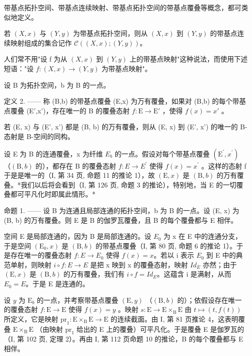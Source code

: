 带基点拓扑空间、带基点连续映射、带基点拓扑空间的带基点覆叠等概念，都可类似地定义。

若 \((X,x)\) 与 \((Y,y)\) 为带基点拓扑空间，则从 \((X,x)\) 到 \((Y,y)\) 的带基点连续映射组成的集合记作 \(\mathcal{C}((X,x);(Y,y))\)。

人们常不用"设 f 为从 \((X, x)\) 到 \((Y, y)\) 上的带基点映射"这种说法，而使用下述短语："设 \(f: (X, x) \to (Y, y)\) 为带基点映射"。

设 B 为拓扑空间，b 为 B 的一点。

定义 2. —— 称 (B,b) 的带基点覆叠 (E,x) 为万有覆叠，如果对 (B,b) 的每个带基点覆叠 (E',x')，存在唯一的 B 的覆叠态射 \(f: \mathrm{E} \to \mathrm{E}'\) ，使得 \(f(x) = x'\) 。

若 (E, x) 与 (E', x') 都是 (B, b) 的万有覆叠，则从 (E, x) 到 (E', x') 的唯一的 B-态射是 B-空间的同构。

设 E 为 B 的连通覆叠，x 为纤维 \(E_{b}\) 的一点。假设对每个带基点覆叠 \((\mathrm{E}^{\prime}, x^{\prime})\) （\((\mathrm{B}, b)\) 的），都存在 B 的覆叠态射 \(f: E \to E^{\prime}\) 使得 \(f(x) = x^{\prime}\) 。这样的态射 f 于是是唯一的（I, 第 34 页, 命题 11 的推论 1），故 \((\mathrm{E}, x)\) 是 \((\mathrm{B}, b)\) 的万有覆叠。*我们以后将会看到（I, 第 126 页, 命题 3 的推论），特别地，当 E 的一切覆叠都可平凡化时即属此情形。*

命题 1. —— 设 B 为连通且局部连通的拓扑空间，b 为 B 的一点。设 (E, x) 为 (B, b) 的万有覆叠。则 E 是 B 的伽罗瓦覆叠，且 B 的每个覆叠都与 E 相伴。

空间 E 是局部连通的，因为 B 是局部连通的。设 \(E_{0}\) 为 x 在 E 中的连通分支，于是空间 \((\mathrm{E}_{0}, x)\) 是 \((\mathrm{B}, b)\) 的带基点覆叠（I, 第 80 页, 命题 6 的推论 1）。于是存在唯一的覆叠态射 \(f: E \to E_{0}\) 使得 \(f(x) = x\)。若以 i 表示 \(E_{0}\) 到 E 中的典范单射，则映射 \(i \circ f: E \to E\) 是把 x 映到 x 的覆叠态射，映射 \(Id_{E}\) 亦然；由于 \((\mathrm{E}, x)\) 是 \((\mathrm{B}, b)\) 的万有覆叠，我们有 \(i \circ f = Id_{E}\)。这蕴含 i 是满射，从而 \(E_{0} = E\)。于是 E 是连通的。

设 \(y\) 为 \(\mathrm{E}_b\) 的一点，并考察带基点覆叠 \((\mathrm{E},y)\) （\((\mathrm{B},b)\) 的）；依假设存在唯一的覆叠态射 \(f\colon \mathrm{E}\to \mathrm{E}\) 使得 \(f(x) = y\) 。映射 \(s\colon \mathrm{E}\to \mathrm{E}\times_{\mathrm{B}}\mathrm{E}\) 由 \(t\mapsto (t,f(t))\) 所定义，它是映射 \(\mathrm{pr}_1\colon \mathrm{E}\times_{\mathrm{B}}\mathrm{E}\to \mathrm{E}\) 的连续截面。由 I, 第 81 页推论 4，这表明覆叠 \(\mathrm{E}\times_{\mathrm{B}}\mathrm{E}\) （由映射 \(\mathrm{pr}_1\) 给出的 E 上的覆叠）可平凡化。于是覆叠 E 是伽罗瓦的（I, 第 102 页, 定理 2）。再由 I, 第 112 页命题 10 的推论，B 的每个覆叠都与 E 相伴。

